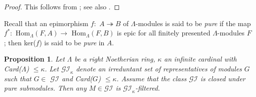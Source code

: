 \documentclass[11pt,a4paper]{article}
\newtheorem{prop}[thm]{Proposition}
\begin{document}
\begin{proof} This follows from  \cite[Corollary 2.7]{lyz}; see also  \cite[Theorem 3.10]{bou1}. \end{proof}

 Recall that an epimorphism   $f:$ $ A\twoheadrightarrow B$ of $\Lambda$-modules is said to be   {\it pure}  if the map   $f^{\ast}:$ Hom$_{\Lambda}$$(F, A)\rightarrow$ Hom$_{\Lambda}$$(F, B)$
is epic for all finitely presented   $\Lambda$-modules $F$; then ker($f$) is said to be  {\it pure} in $A$.

\begin{prop}\label{prop3}  Let $\Lambda$  be    a right Noetherian ring, $\kappa$ an infinite cardinal with {\rm Card($\Lambda$)}  $\leq \kappa$.
Let $\mathscr{GI}_{\kappa}$  denote  an irreduntant set of representatives of modules $G$  such that $G \in$ $\mathscr{GI}$ and {\rm Card($G$)}  $\leq \kappa$.
 Assume that the class   $\mathscr{GI}$   is closed under pure submodules.
Then  any  $M\in \mathscr{GI}$  is $\mathscr{GI}_{\kappa}$-filtered. \end{prop}
\end{document}
